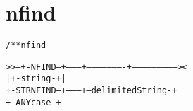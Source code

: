 \section{nfind}
\begin{shaded}
\begin{alltt}
/** nfind


   >>--+-NFIND--+--------+----------------------+--------------------------><
       |        +-string-+                      |
       +-STRNFIND--+---------+--delimitedString-+
                   +-ANYcase-+

\end{alltt}
\end{shaded}
